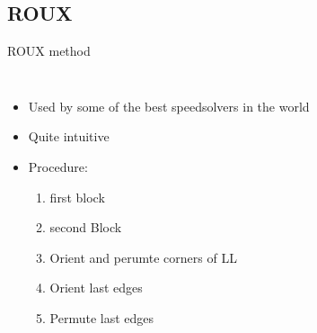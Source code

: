 \documentclass[10pt]{beamer}
\begin{document}
        \subsection{ROUX}
            \begin{frame}{ROUX method}
                \begin{columns}[c]
                        \begin{itemize}
                            \item<1-> Used by some of the best speedsolvers in the world
                            \item<2-> Quite intuitive 
                            \item<3-> Procedure:
                            \begin{enumerate}
                                \item<5-> first block
                                \item<6-> second Block
                                \item<7-> Orient and perumte corners of LL
                                \item<8-> Orient last edges
                                \item<9-> Permute last edges
                            \end{enumerate}
                        \end{itemize}
                        \begin{figure}
                        \end{figure}
                \end{columns}
            \end{frame}
\end{document}
